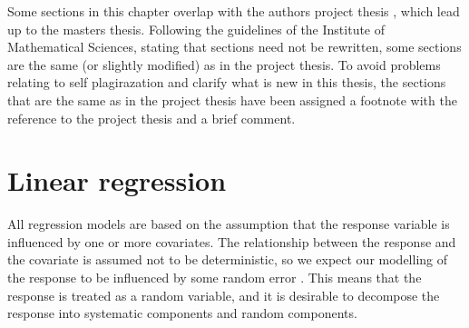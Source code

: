 Some sections in this chapter overlap with the authors project thesis \citep{Arnstad}, which lead up to the masters thesis. Following the guidelines of the Institute of Mathematical Sciences, stating that sections need not be rewritten, some sections are the same (or slightly modified) as in the project thesis. To avoid problems relating to self plagirazation and clarify what is new in this thesis, the sections that are the same as in the project thesis have been assigned a footnote with the reference to the project thesis and a brief comment.
\section{Linear regression}
\label{sec:linreg}
All regression models are based on the assumption that the response variable is influenced by one or more covariates.
The relationship between the response and the covariate is assumed not to be deterministic, so we expect our modelling of the response to be influenced by some random error \citep{GLMM_book}.
This means that the response is treated as a random variable, and it is desirable to decompose the response into systematic components and random components.
